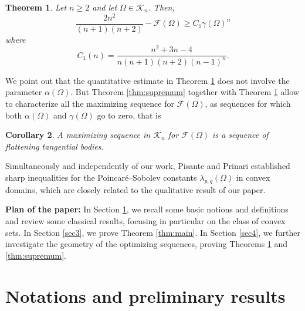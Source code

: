 \documentclass[oneside,a4paper,11pt,notitlepage]{article}
\theoremstyle{definition}
\theoremstyle{plain}
\newtheorem{teorema}{Theorem}[section]
\newtheorem{corollario}[teorema]{Corollary}
\theoremstyle{definition}
\begin{document}
\begin{teorema}\label{thm:quantitative}
    Let $n\ge 2$ and let $\Omega \in \mathcal{K}_n$. Then,
    \begin{equation*}
     \frac{2n^2}{(n+1)(n+2)}-\mathcal{F}(\Omega)\geq C_1\gamma(\Omega)^n
    \end{equation*}
      where
    \begin{equation*}
        C_1(n) = \frac{n^2+3n-4}{n(n+1)(n+2)(n-1)^{n}}.
    \end{equation*}
\end{teorema}
We point out that the quantitative estimate in Theorem \ref{thm:quantitative} does not involve the parameter $\alpha(\Omega)$. But Theorem \ref{thm:supremum} together with Theorem \ref{thm:quantitative} allow to characterize all the maximizing sequence for $\mathcal{F}(\Omega)$, as sequences for which both $\alpha(\Omega)$ and $\gamma(\Omega)$ go to zero, that is
\begin{corollario}
\label{Corol}
A maximizing sequence in $\mathcal{K}_n$ for $\mathcal{F}(\Omega)$  is a sequence of flattening tangential bodies.
\end{corollario}



Simultaneously and independently of our work, Pisante and Prinari  \cite{PP} established sharp inequalities for the Poincaré--Sobolev constants $\lambda_{p,q}(\Omega)$ in convex domains, which are closely related to the qualitative result of our paper.

\vspace{0.5cm}
\textbf{Plan of the paper:} In Section \ref{sec2}, we recall some basic notions and definitions and review some classical results, focusing in particular on the class of convex sets. In Section \ref{sec3}, we prove Theorem \ref{thm:main}. In Section \ref{sec4}, we further investigate the geometry of the optimizing sequences, proving Theorems \ref{thm:quantitative} and \ref{thm:supremum}.







\section{Notations and preliminary results}
\label{sec2}
\end{document}

